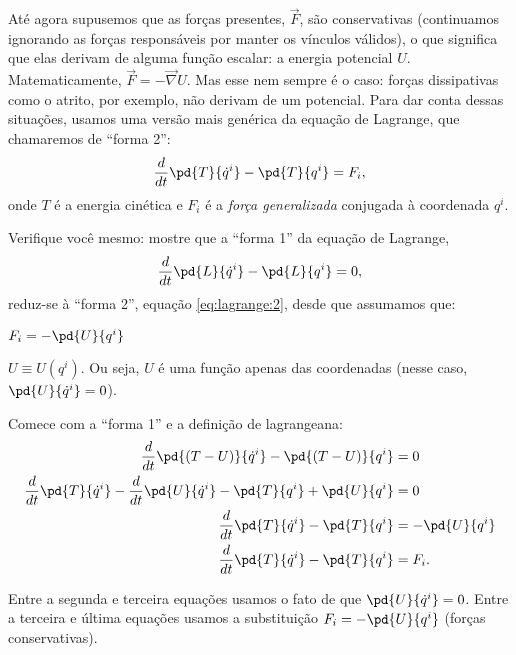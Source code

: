 \begin{question}
    Até agora supusemos que as forças presentes, $\vec F$, são conservativas (continuamos ignorando as forças responsáveis por manter os vínculos válidos), o que significa que elas derivam de alguma função escalar: a energia potencial $U$.
    Matematicamente, $\vec F = -\vec\nabla U$.
    Mas esse nem sempre é o caso: forças dissipativas como o atrito, por exemplo, não derivam de um potencial.
    Para dar conta dessas situações, usamos uma versão mais genérica da equação de Lagrange, que chamaremos de ``forma 2'':
    \begin{equation}\label{eq:lagrange:2}
      \frac{d}{dt}\pd{T}{\dot q^i} - \pd{T}{q^i} = F_{i},
    \end{equation}
    onde $T$ é a energia cinética e $F_i$ é a \emph{força generalizada} conjugada à coordenada $q^i$.

    Verifique você mesmo: mostre que a ``forma 1'' da equação de Lagrange,
    \begin{equation*}
      \frac{d}{dt}\pd{L}{\dot q^i} - \pd{L}{q^i} = 0,
    \end{equation*}
    reduz-se à ``forma 2'', equação \eqref{eq:lagrange:2}, desde que assumamos que:
    \begin{compactenum}
      \item $F_i = -\pd{U}{q^i}$
      \item $U \equiv U(q^i)$.
      Ou seja, $U$ é uma função apenas das coordenadas (nesse caso, $\pd{U}{\dot q^i} = 0$).
    \end{compactenum}

    \begin{solution}
      Comece com a ``forma 1'' e a definição de lagrangeana:
      \begin{align*}
        \frac{d}{dt}\pd{(T - U)}{\dot q^i} - \pd{(T - U)}{q^i} &= 0 \\
        \frac{d}{dt}\pd{T}{\dot q^i} - \frac{d}{dt}\pd{U}{\dot q^i} - \pd{T}{q^i} + \pd{U}{q^i} &= 0 \\
        \frac{d}{dt}\pd{T}{\dot q^i} - \pd{T}{q^i} &= -\pd{U}{q^i} \\
        \frac{d}{dt}\pd{T}{\dot q^i} - \pd{T}{q^i} &= F_i.
      \end{align*}

      Entre a segunda e terceira equações usamos o fato de que $\pd{U}{\dot q^i} = 0$.
      Entre a terceira e última equações usamos a substituição $F_i = -\pd{U}{q^i}$ (forças conservativas).
    \end{solution}
\end{question}